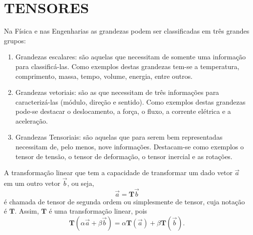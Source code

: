 \chapter{TENSORES} \label{Tensor}


Na Física e nas Engenharias as grandezas podem ser classificadas em três grandes grupos:

\begin{enumerate}
	
	\item Grandezas escalares: são aquelas que necessitam de somente uma informação para classificá-las. Como exemplos destas grandezas tem-se a temperatura, comprimento, massa, tempo, volume, energia, entre outros.
	\item Grandezas vetoriais: são as que necessitam de três informações para caracterizá-las (módulo, direção e sentido). Como exemplos destas grandezas pode-se destacar o deslocamento, a força, o fluxo, a corrente elétrica e a aceleração.
	\item Grandezas Tensoriais: são aquelas que para serem bem representadas necessitam de, pelo menos, nove informações. Destacam-se como exemplos o tensor de tensão, o tensor de deformação, o tensor inercial e as rotações. 
\end{enumerate}

A transformação linear que tem a capacidade de transformar um dado vetor $ \vec{a} $ em um outro vetor $ \vec{b} $, ou seja,
\begin{equation}
	\vec{a} = \textbf{T} \vec{b}
\end{equation}
é chamada de tensor de segunda ordem ou simplesmente de tensor, cuja notação é $ \textbf{T} $. Assim, $ \textbf{T} $ é uma transformação linear, pois
\begin{equation}
	\textbf{T} ( \alpha \vec{a} + \beta \vec{b}) = \alpha \textbf{T}( \vec{a}) + \beta \textbf{T} ( \vec{b}).
\end{equation}

